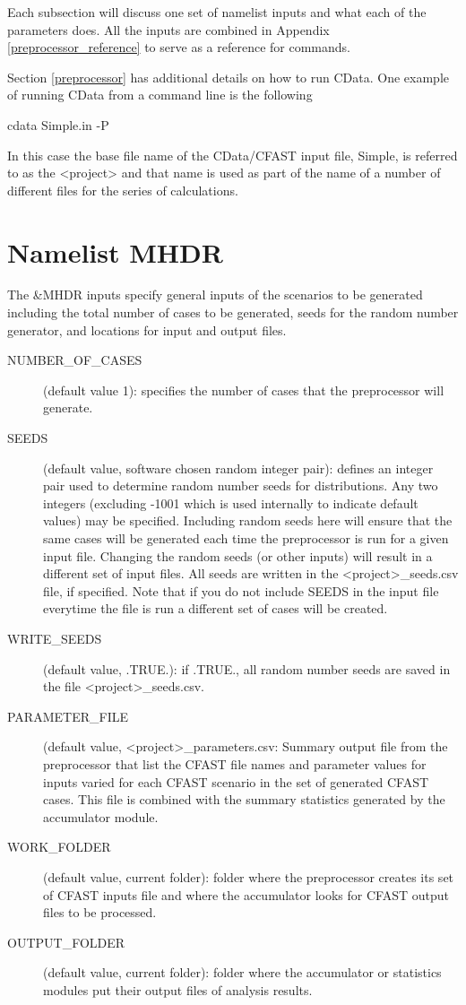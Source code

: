 \documentclass[12pt,twoside]{book}
\begin{document}
Each subsection will discuss one set of namelist inputs and what each of the parameters does. All the inputs are combined in Appendix \ref{preprocessor_reference}  to serve as a reference for commands.

Section \ref{preprocessor} has additional details on how to run CData. One example of running CData from a command line is the following

\vspace{\baselineskip}
{\ct cdata Simple.in -P}
\vspace{\baselineskip}

In this case the base file name of the CData/CFAST input file, {\ct Simple}, is referred to as the {\ct <project>} and that name is used as part of the name of a number of different files for the series of calculations.

\section{Namelist MHDR}
\label{info:MHDR}

The {\ct \&MHDR} inputs specify general inputs of the scenarios to be generated including the total number of cases to be generated, seeds for the random number generator, and locations for input and output files.

\begin{description}
  \item[NUMBER\_OF\_CASES] (default value 1): specifies the number of cases that the preprocessor will generate.
  \item[SEEDS] (default value, software chosen random integer pair): defines an integer pair used to determine random number seeds for distributions. Any two integers (excluding -1001 which is used internally to indicate default values) may be specified. Including random seeds here will ensure that the same cases will be generated each time the preprocessor is run for a given input file. Changing the random seeds (or other inputs) will result in a different set of input files.  All seeds are written in the {\ct <project>\_seeds.csv} file, if specified. Note that if you do not include {\ct SEEDS} in the input file everytime the file is run a different set of cases will be created.
  \item[WRITE\_SEEDS] (default value, .TRUE.): if .TRUE., all random number seeds are saved in the file {\ct <project>\_seeds.csv}.
  \item[PARAMETER\_FILE] (default value, {\ct <project>\_parameters.csv}: Summary output file from the preprocessor that list the CFAST file names and parameter values for inputs varied for each CFAST scenario in the set of generated CFAST cases. This file is combined with the summary statistics generated by the accumulator module.
  \item[WORK\_FOLDER] (default value, current folder): folder where the preprocessor creates its set of CFAST inputs file and where the accumulator looks for CFAST output files to be processed.
  \item[OUTPUT\_FOLDER] (default value, current folder): folder where the accumulator or statistics modules put their output files of analysis results.
\end{description}
\end{document}
